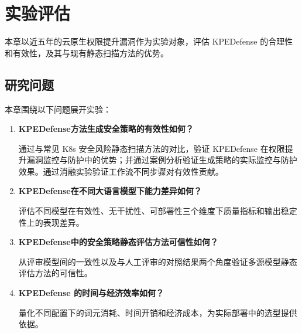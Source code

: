 
\chapter{实验评估}\label{chap:experiment}

本章以近五年的云原生权限提升漏洞作为实验对象，评估 KPEDefense 的合理性和有效性，及其与现有静态扫描方法的优势。

\section{研究问题}

本章围绕以下问题展开实验：

\begin{enumerate}
\item[\textbf{(1)}] \textbf{KPEDefense方法生成安全策略的有效性如何？}

通过与常见 K8s 安全风险静态扫描方法的对比，验证 KPEDefense 在权限提升漏洞监控与防护中的优势；并通过案例分析验证生成策略的实际监控与防护效果。通过消融实验验证工作流不同步骤对有效性贡献。

\item[\textbf{(2)}] \textbf{KPEDefense在不同大语言模型下能力差异如何？}

评估不同模型在有效性、无干扰性、可部署性三个维度下质量指标和输出稳定性上的表现差异。

\item[\textbf{(3)}] \textbf{KPEDefense中的安全策略静态评估方法可信性如何？}

从评审模型间的一致性以及与人工评审的对照结果两个角度验证多源模型静态评估方法的可信性。

\item[\textbf{(4)}] \textbf{KPEDefense 的时间与经济效率如何？}

量化不同配置下的词元消耗、时间开销和经济成本，为实际部署中的选型提供依据。

\end{enumerate}

